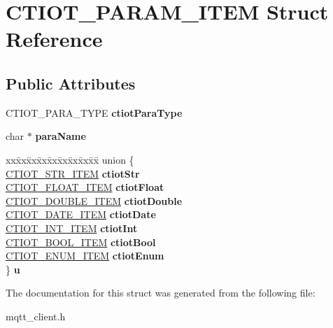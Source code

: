 \hypertarget{struct_c_t_i_o_t___p_a_r_a_m___i_t_e_m}{}\section{C\+T\+I\+O\+T\+\_\+\+P\+A\+R\+A\+M\+\_\+\+I\+T\+EM Struct Reference}
\label{struct_c_t_i_o_t___p_a_r_a_m___i_t_e_m}
\subsection*{Public Attributes}
\begin{DoxyCompactItemize}
\item 
\mbox{\label{struct_c_t_i_o_t___p_a_r_a_m___i_t_e_m_a22e0ae2999fdaf1d9685b0110f0e23c5}} 
C\+T\+I\+O\+T\+\_\+\+P\+A\+R\+A\+\_\+\+T\+Y\+PE {\bfseries ctiot\+Para\+Type}
\item 
\mbox{\label{struct_c_t_i_o_t___p_a_r_a_m___i_t_e_m_a0b720e54496c93ad3a02fb0511a90d24}} 
char $\ast$ {\bfseries para\+Name}
\item 
\mbox{\label{struct_c_t_i_o_t___p_a_r_a_m___i_t_e_m_aaeb45496324074e3f974512c6d534eb7}} 
\begin{tabbing}
xx\=xx\=xx\=xx\=xx\=xx\=xx\=xx\=xx\=\kill
union \{\\
\>\mbox{\hyperlink{struct_c_t_i_o_t___s_t_r___i_t_e_m}{CTIOT\_STR\_ITEM}} {\bfseries ctiotStr}\\
\>\mbox{\hyperlink{struct_c_t_i_o_t___f_l_o_a_t___i_t_e_m}{CTIOT\_FLOAT\_ITEM}} {\bfseries ctiotFloat}\\
\>\mbox{\hyperlink{struct_c_t_i_o_t___d_o_u_b_l_e___i_t_e_m}{CTIOT\_DOUBLE\_ITEM}} {\bfseries ctiotDouble}\\
\>\mbox{\hyperlink{struct_c_t_i_o_t___d_a_t_e___i_t_e_m}{CTIOT\_DATE\_ITEM}} {\bfseries ctiotDate}\\
\>\mbox{\hyperlink{struct_c_t_i_o_t___i_n_t___i_t_e_m}{CTIOT\_INT\_ITEM}} {\bfseries ctiotInt}\\
\>\mbox{\hyperlink{struct_c_t_i_o_t___b_o_o_l___i_t_e_m}{CTIOT\_BOOL\_ITEM}} {\bfseries ctiotBool}\\
\>\mbox{\hyperlink{struct_c_t_i_o_t___e_n_u_m___i_t_e_m}{CTIOT\_ENUM\_ITEM}} {\bfseries ctiotEnum}\\
\} {\bfseries u}\\

\end{tabbing}\end{DoxyCompactItemize}


The documentation for this struct was generated from the following file\+:\begin{DoxyCompactItemize}
\item 
mqtt\+\_\+client.\+h\end{DoxyCompactItemize}
